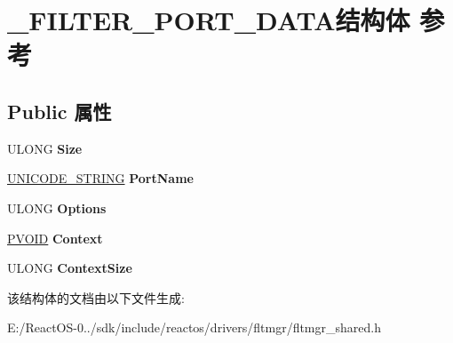 \hypertarget{struct___f_i_l_t_e_r___p_o_r_t___d_a_t_a}{}\section{\+\_\+\+F\+I\+L\+T\+E\+R\+\_\+\+P\+O\+R\+T\+\_\+\+D\+A\+T\+A结构体 参考}
\label{struct___f_i_l_t_e_r___p_o_r_t___d_a_t_a}
\subsection*{Public 属性}
\begin{DoxyCompactItemize}
\item 
\mbox{\label{struct___f_i_l_t_e_r___p_o_r_t___d_a_t_a_aeef523456db35a2f6ecc14baa4a95597}} 
U\+L\+O\+NG {\bfseries Size}
\item 
\mbox{\label{struct___f_i_l_t_e_r___p_o_r_t___d_a_t_a_aaaac2ed68862c062e75b9984f11437af}} 
\hyperlink{struct___u_n_i_c_o_d_e___s_t_r_i_n_g}{U\+N\+I\+C\+O\+D\+E\+\_\+\+S\+T\+R\+I\+NG} {\bfseries Port\+Name}
\item 
\mbox{\label{struct___f_i_l_t_e_r___p_o_r_t___d_a_t_a_a9e031d0eaf29b8d69bf03f41cba20724}} 
U\+L\+O\+NG {\bfseries Options}
\item 
\mbox{\label{struct___f_i_l_t_e_r___p_o_r_t___d_a_t_a_a5b5737c5ffd5290e2647752d5848243a}} 
\hyperlink{interfacevoid}{P\+V\+O\+ID} {\bfseries Context}
\item 
\mbox{\label{struct___f_i_l_t_e_r___p_o_r_t___d_a_t_a_ae620ce6315f826fb3b040785e8c211ca}} 
U\+L\+O\+NG {\bfseries Context\+Size}
\end{DoxyCompactItemize}


该结构体的文档由以下文件生成\+:\begin{DoxyCompactItemize}
\item 
E\+:/\+React\+O\+S-\/0../sdk/include/reactos/drivers/fltmgr/fltmgr\+\_\+shared.\+h\end{DoxyCompactItemize}
